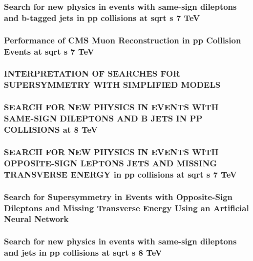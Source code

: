 \documentclass[a4paper, 11pt, twoside, openright]{report}
\begin{document}
\subsubsection{Search for new physics in events with same-sign dileptons and b-tagged jets in pp collisions at sqrt s 7 TeV}
%
\subsubsection{Performance of CMS Muon Reconstruction in pp Collision Events at sqrt s 7 TeV}
%
\subsubsection{INTERPRETATION OF SEARCHES FOR SUPERSYMMETRY WITH SIMPLIFIED MODELS}
%
\subsubsection{SEARCH FOR NEW PHYSICS IN EVENTS WITH SAME-SIGN DILEPTONS AND B JETS IN PP COLLISIONS at 8 TeV}
%
\subsubsection{SEARCH FOR NEW PHYSICS IN EVENTS WITH OPPOSITE-SIGN LEPTONS JETS AND MISSING TRANSVERSE ENERGY in pp collisions at sqrt s 7 TeV}
%
\subsubsection{Search for Supersymmetry in Events with Opposite-Sign Dileptons and Missing Transverse Energy Using an Artificial Neural Network}
%
\subsubsection{Search for new physics in events with same-sign dileptons and jets in pp collisions at sqrt s 8 TeV}
%
\end{document}
